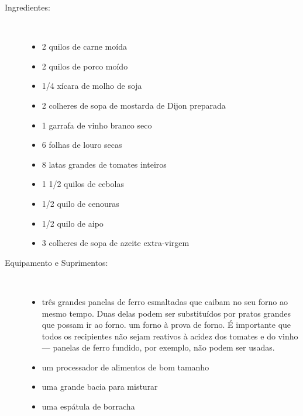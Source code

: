 \documentclass[11pt,letterpaper]{article}
\begin{document}
\begin {description}

\item [Ingredientes:] \ \\
\begin {itemize}
\item 2 quilos de carne moída
\item 2 quilos de porco moído
\item 1/4 xícara de molho de soja
\item 2 colheres de sopa de mostarda de Dijon preparada
\item 1 garrafa de vinho branco seco
\item 6 folhas de louro secas
\item 8 latas grandes de tomates inteiros
\item 1 1/2 quilos de cebolas
\item 1/2 quilo de cenouras
\item 1/2 quilo de aipo
\item 3 colheres de sopa de azeite extra-virgem
\end {itemize}
\item [Equipamento e Suprimentos:] \ \\
\begin {itemize}
\item três grandes panelas de ferro esmaltadas  que caibam no seu forno ao mesmo tempo. Duas delas podem ser substituídos por pratos grandes que possam ir ao forno. um forno à prova de forno. É importante que todos os recipientes não sejam reativos \`a acidez dos tomates e do vinho --- panelas de ferro fundido, por exemplo, não podem ser usadas.
\item um processador de alimentos de bom tamanho
\item uma grande bacia para misturar
\item uma espátula de borracha
\end {itemize}



\end{description}
\end{document}
